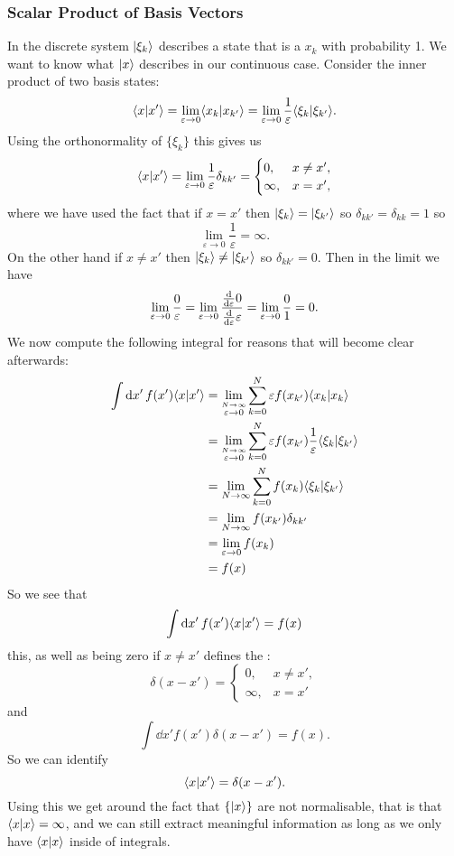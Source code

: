    \subsubsection{Scalar Product of Basis Vectors}
    In the discrete system \(\vert {\xi_k} \rangle\) describes a state that is a \(x_k\) with probability 1.
    We want to know what \(\vert {x} \rangle\) describes in our continuous case.
    Consider the inner product of two basis states:
    \[\langle {x} \vert {x'} \rangle = \lim_{\varepsilon\to 0}\langle {x_k} \vert {x_{k'}} \rangle = \lim_{\varepsilon\to 0} \frac{1}{\varepsilon}\langle {\xi_k} \vert {\xi_{k'}} \rangle.\]
    Using the orthonormality of \(\{\xi_k\}\) this gives us
    \[
        \langle {x} \vert {x'} \rangle = \lim_{\varepsilon\to 0}\frac{1}{\varepsilon}\delta_{kk'} =
        \begin{cases}
            0, & x \ne x',\\
            \infty, &x = x',
        \end{cases}
    \]
    where we have used the fact that if \(x = x'\) then \(\vert {\xi_k} \rangle = \vert {\xi_{k'}} \rangle\) so \(\delta_{kk'} = \delta_{kk} = 1\) so
    \[\lim_{\varepsilon\to 0} \frac{1}{\varepsilon} = \infty.\]
    On the other hand if \(x \ne x'\) then \(\vert {\xi_k} \rangle\ne\vert {\xi_{k'}} \rangle\) so \(\delta_{kk'} = 0\).
    Then in the limit we have
    \[\lim_{\varepsilon\to 0}\frac{0}{\varepsilon} = \lim_{\varepsilon\to 0}\frac{\dv{\varepsilon}0}{\dv{\varepsilon}\varepsilon} = \lim_{\varepsilon\to 0}\frac{0}{1} = 0.\]
    We now compute the following integral for reasons that will become clear afterwards:
    \begin{align*}
        \int\dd{x'} f(x')\langle {x} \vert {x'} \rangle &= \lim_{\stackrel{N\to \infty}{\varepsilon\to 0}}\sum_{k=0}^{N} \varepsilon f(x_{k'})\langle {x_k} \vert {x_k} \rangle\\
        &= \lim_{\stackrel{N\to \infty}{\varepsilon\to 0}}\sum_{k=0}^{N} \varepsilon f(x_{k'})\frac{1}{\varepsilon}\langle {\xi_{k}} \vert {\xi_{k'}} \rangle\\
        &= \lim_{N\to\infty}\sum_{k=0}^{N}  f(x_k)\langle {\xi_{k}} \vert {\xi_{k'}} \rangle\\
        &= \lim_{N\to\infty} f(x_{k'})\delta_{kk'}\\
        &= \lim_{\varepsilon\to 0}f(x_{k})\\
        &= f(x)
    \end{align*}
    So we see that
    \[\int\dd{x'}f(x')\langle {x} \vert {x'} \rangle = f(x)\]
    this, as well as being zero if \(x \ne x'\) defines the :
    \[
        \delta(x - x') =
        \begin{cases}
            0, & x\ne x',\\
            \infty, & x = x'
        \end{cases}
    \]
    and
    \[\int\dd{x'}f(x')\delta(x - x') = f(x).\]
    So we can identify
    \[\langle {x} \vert {x'} \rangle = \delta(x - x').\]
    Using this we get around the fact that \(\{\vert {x} \rangle\}\) are not normalisable, that is that \(\langle {x} \vert {x} \rangle = \infty\), and we can still extract meaningful information as long as we only have \(\langle {x} \vert {x} \rangle\) inside of integrals.
    
    
